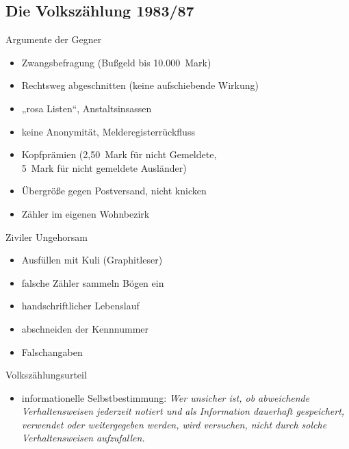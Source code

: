 \documentclass[ignorenonframetext,ucs]{beamer}
\begin{document}
\subsection{Die Volkszählung 1983/87}

\begin{frame}{Argumente der Gegner}\begin{itemize}
\item Zwangsbefragung (Bußgeld bis 10.000~Mark)
\item Rechtsweg abgeschnitten (keine aufschiebende Wirkung)
\item „rosa Listen“, Anstaltsinsassen
\item keine Anonymität, Melderegisterrückfluss
\item Kopfprämien (2,50~Mark für nicht Gemeldete,\\5~Mark für nicht gemeldete Ausländer)
\item Übergröße gegen Postversand, nicht knicken
\item Zähler im eigenen Wohnbezirk
\end{itemize}\end{frame}

\begin{frame}{Ziviler Ungehorsam}\begin{itemize}
\item Ausfüllen mit Kuli (Graphitleser)
\item falsche Zähler sammeln Bögen ein
\item handschriftlicher Lebenslauf
\item abschneiden der Kennnummer
\item Falschangaben
\end{itemize}\end{frame}

\begin{frame}{Volkszählungsurteil}\begin{itemize}
\item informationelle Selbstbestimmung: \emph{Wer unsicher ist, ob abweichende Verhaltensweisen jederzeit notiert und als Information dauerhaft gespeichert, verwendet oder weitergegeben werden, wird versuchen, nicht durch solche Verhaltensweisen aufzufallen.}
\end{itemize}\end{frame}
\end{document}
